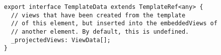 \begin{verbatim}
export interface TemplateData extends TemplateRef<any> {
  // views that have been created from the template
  // of this element, but inserted into the embeddedViews of
  // another element. By default, this is undefined.
  _projectedViews: ViewData[];
}
\end{verbatim}
